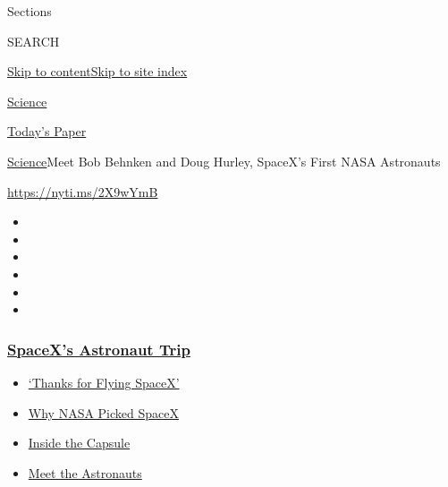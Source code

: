 Sections

SEARCH

\protect\hyperlink{site-content}{Skip to
content}\protect\hyperlink{site-index}{Skip to site index}

\href{https://www.nytimes3xbfgragh.onion/section/science}{Science}

\href{https://myaccount.nytimes3xbfgragh.onion/auth/login?response_type=cookie\&client_id=vi}{}

\href{https://www.nytimes3xbfgragh.onion/section/todayspaper}{Today's
Paper}

\href{/section/science}{Science}\textbar{}Meet Bob Behnken and Doug
Hurley, SpaceX's First NASA Astronauts

\url{https://nyti.ms/2X9wYmB}

\begin{itemize}
\item
\item
\item
\item
\item
\item
\end{itemize}

\hypertarget{spacexs-astronaut-trip}{%
\subsubsection{\texorpdfstring{\href{https://www.nytimes3xbfgragh.onion/2020/08/02/science/spacex-astronauts-splashdown.html?name=styln-nasa-spacex\&region=TOP_BANNER\&block=storyline_menu_recirc\&action=click\&pgtype=Article\&impression_id=7d60ce30-f2da-11ea-831c-8be44acb33df\&variant=undefined}{SpaceX's
Astronaut
Trip}}{SpaceX's Astronaut Trip}}\label{spacexs-astronaut-trip}}

\begin{itemize}
\tightlist
\item
  \href{https://www.nytimes3xbfgragh.onion/2020/08/02/science/spacex-astronauts-splashdown.html?name=styln-nasa-spacex\&region=TOP_BANNER\&block=storyline_menu_recirc\&action=click\&pgtype=Article\&impression_id=7d60ce30-f2da-11ea-831c-8be44acb33df\&variant=undefined}{`Thanks
  for Flying SpaceX'}
\item
  \href{https://www.nytimes3xbfgragh.onion/2020/05/26/science/spacex-launch-nasa.html?name=styln-nasa-spacex\&region=TOP_BANNER\&block=storyline_menu_recirc\&action=click\&pgtype=Article\&impression_id=7d60f540-f2da-11ea-831c-8be44acb33df\&variant=undefined}{Why
  NASA Picked SpaceX}
\item
  \href{https://www.nytimes3xbfgragh.onion/interactive/2020/05/26/science/spacex-nasa.html?name=styln-nasa-spacex\&region=TOP_BANNER\&block=storyline_menu_recirc\&action=click\&pgtype=Article\&impression_id=7d60f541-f2da-11ea-831c-8be44acb33df\&variant=undefined}{Inside
  the Capsule}
\item
  \href{https://www.nytimes3xbfgragh.onion/2020/05/27/science/bob-behnken-doug-hurley.html?name=styln-nasa-spacex\&region=TOP_BANNER\&block=storyline_menu_recirc\&action=click\&pgtype=Article\&impression_id=7d60f542-f2da-11ea-831c-8be44acb33df\&variant=undefined}{Meet
  the Astronauts}
\end{itemize}

